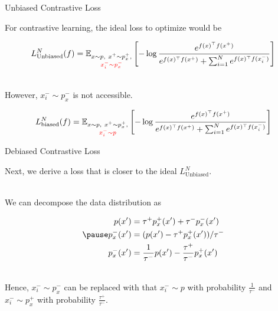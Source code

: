 \documentclass[aspectratio=169,mathserif]{beamer}  %
\newcommand{\E}{\mathbb{E}}
\newcommand{\red}{\textcolor{red}}
\begin{document}
\begin{frame}{Unbiased Contrastive Loss}

For contrastive learning, the ideal loss to optimize would be

\begin{eqnarray}
\begin{aligned}
L_{\text{Unbiased}}^N(f)=\E_{\substack{x\sim p,\ x^+\sim p_x^+,\\ \red{x_i^-\sim p_x^-} }}\left[-\log \frac{e^{f(x)^\top f(x^+)}}{e^{f(x)^\top f(x^+)}+ \sum_{i=1}^{N}e^{f(x)^\top f(x_i^-)}} \right]
\end{aligned}
\end{eqnarray}


\pause

~\\
However, $x_i^-\sim p_x^-$ is not accessible.

\begin{eqnarray}
\begin{aligned}
L_{\text{biased}}^N(f)=\E_{\substack{x\sim p,\ x^+\sim p_x^+,\\ \red{x_i^-\sim p} }}\left[-\log \frac{e^{f(x)^\top f(x^+)}}{e^{f(x)^\top f(x^+)}+ \sum_{i=1}^{N}e^{f(x)^\top f(x_i^-)}} \right]
\end{aligned}
\end{eqnarray}
    
\end{frame}



\begin{frame}{Debiased Contrastive Loss}

Next, we derive a loss that is closer to the ideal $L_{\text{Unbiased}}^N$.

\pause
~\\
We can decompose the data distribution as

\begin{eqnarray}
\begin{aligned}
p(x')&=\tau^+p_x^+(x')+\tau^-p_x^-(x') \\ \pause
p_x^-(x')&=(p(x')-\tau^+p_x^+(x'))/\tau^-\\
p_x^-(x')&=\frac{1}{\tau^-}p(x')-\frac{\tau^+}{\tau^-}p_x^+(x')
\end{aligned}
\end{eqnarray}

\pause
~\\
Hence, $x_i^-\sim p_x^-$ can be replaced with that $x_i^-\sim p$ with probability $\frac{1}{\tau^-}$ and $x_i^-\sim p_x^+$ with probability $\frac{\tau^+}{\tau^-}$.

\end{frame}
\end{document}
